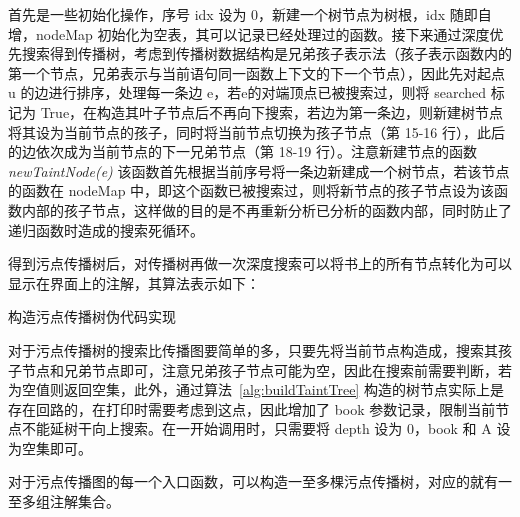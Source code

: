 首先是一些初始化操作，序号 idx 设为 0，新建一个树节点为树根，idx 随即自增，nodeMap 初始化为空表，其可以记录已经处理过的函数。接下来通过深度优先搜索得到传播树，考虑到传播树数据结构是兄弟孩子表示法（孩子表示函数内的第一个节点，兄弟表示与当前语句同一函数上下文的下一个节点），因此先对起点 u 的边进行排序，处理每一条边 e，若e的对端顶点已被搜索过，则将 searched 标记为 True，在构造其叶子节点后不再向下搜索，若边为第一条边，则新建树节点将其设为当前节点的孩子，同时将当前节点切换为孩子节点（第 15-16 行），此后的边依次成为当前节点的下一兄弟节点（第 18-19 行）。注意新建节点的函数 \textit{newTaintNode(e)} 该函数首先根据当前序号将一条边新建成一个树节点，若该节点的函数在 nodeMap 中，即这个函数已被搜索过，则将新节点的孩子节点设为该函数内部的孩子节点，这样做的目的是不再重新分析已分析的函数内部，同时防止了递归函数时造成的搜索死循环。

得到污点传播树后，对传播树再做一次深度搜索可以将书上的所有节点转化为可以显示在界面上的注解，其算法表示如下：

\begin{algorithm}[!htb]\footnotesize
    \caption{构造污点传播树伪代码实现}
    \label{alg:buildAnnotation}
\end{algorithm}

对于污点传播树的搜索比传播图要简单的多，只要先将当前节点构造成，搜索其孩子节点和兄弟节点即可，注意兄弟孩子节点可能为空，因此在搜索前需要判断，若为空值则返回空集，此外，通过算法~\ref{alg:buildTaintTree} 构造的树节点实际上是存在回路的，在打印时需要考虑到这点，因此增加了 book 参数记录，限制当前节点不能延树干向上搜索。在一开始调用时，只需要将 depth 设为 0，book 和 A 设为空集即可。

对于污点传播图的每一个入口函数，可以构造一至多棵污点传播树，对应的就有一至多组注解集合。

